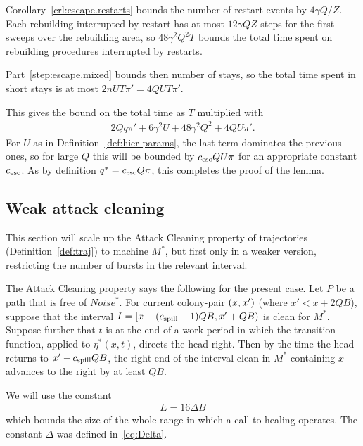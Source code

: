 \documentclass[11pt]{memoir}
\theoremstyle{definition} %
\def\B{B}
\def\U{U}
\newcommand{\E}{E} %
\newcommand{\escno}{q}
\newcommand{\Noise}{\mathit{Noise}}
\newcommand{\passno}{\pi}
\newcommand{\Q}{Q} %
\newcommand{\Tu}{T}
\newcommand{\Z}{Z} %
\newcommand{\cns}[1]{c_{\textrm{\upshape #1}}}
\newcommand{\CEsc}{\cns{esc}}
\newcommand{\CSpill}{\cns{spill}}
\begin{document}
\begin{Proof}
\begin{prooof}
 Corollary~\ref{crl:escape.restarts} bounds the number of restart events by \( 4\gamma\Q/\Z \).
Each rebuilding interrupted by restart has at most \( 12\gamma\Q\Z \) steps for the first
sweeps over the rebuilding area, so \( 48\gamma^{2}\Q^{2}\Tu \) bounds
the total time spent on rebuilding procedures interrupted by restarts.

Part~\ref{step:escape.mixed} bounds then number of stays, so the total
time spent in short stays is at most \(   2n\U\Tu\passno' = 4\Q\U\Tu\passno' \).

This gives the bound on the total time as \( \Tu \) multiplied with
\begin{align*}
  2\Q\escno\passno' +  6\gamma^{2}\U + 48\gamma^{2}\Q^{2} + 4\Q\U\passno'.
 \end{align*}
For \( \U \) as in Definition~\ref{def:hier-params},
the last term dominates the previous ones, so for large \( \Q \) this will be bounded by
\( \CEsc\Q\U\passno \) for an appropriate constant \( \CEsc \).
As by definition \( \escno^{*}=\CEsc\Q\passno \), this completes the proof of the lemma.
\end{prooof} %
\end{Proof}


\subsection{Weak attack cleaning}

This section will scale up the Attack Cleaning
property of trajectories (Definition~\ref{def:traj})
to machine \( M^{*} \), but first only in 
a weaker version, restricting the number of bursts in the relevant interval.

The Attack Cleaning property says the following for the present case.
Let \( P \) be a path that is free of \( \Noise^{*} \).
For current colony-pair \( (x,x') \) (where \( x'< x+2\Q\B \)), suppose that the interval
\( I=\lint{x-(\CSpill+1)\Q\B}{x'+\Q\B} \) is clean for \( M^{*} \).
Suppose further that \( t \) is at the end of a work period in which
the transition function, applied to \( \eta^{*}(x,t) \), directs the head right.
Then by the time the head returns to \( x'-\CSpill\Q\B \),
the right end of the interval clean in \( M^{*} \)
containing \( x \) advances to the right by at least \( \Q\B \).

We will use the constant
\begin{align}\label{eq:E}
   \E =16\Delta\B
\end{align}
which bounds the size of the whole range in which a call to healing operates.
The constant \( \Delta \) was defined in~\eqref{eq:Delta}.
\end{document}
